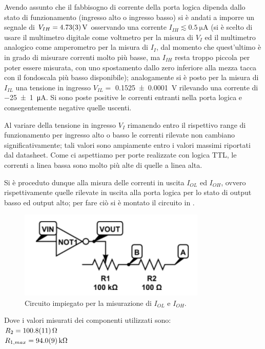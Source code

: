 	Avendo assunto che il fabbisogno di corrente della porta logica dipenda 	dallo stato di funzionamento (ingresso alto o ingresso basso)
	si è andati a imporre un segnale di $V_{IH} = \SI{4.73\pm 0.03}{\volt}$ osservando una corrente $I_{IH} \lesssim \SI{0.5}{\micro \ampere}$ (si è scelto di usare il multimetro digitale come voltmetro per la misura di $V_I$ ed il multimetro analogico come amperometro per la misura di $I_I$, dal momento che quest'ultimo è in grado di misurare correnti molto più basse, ma $I_{IH}$ resta troppo piccola per poter essere misurata, con uno spostamento dallo zero inferiore alla mezza tacca con il fondoscala più basso disponibile);
	analogamente si è posto per la misura di  $I_{IL}$ una tensione in ingresso $V_{IL} =$ \SI{0.1525(1)}{\volt} rilevando una corrente di \SI{-25(1)}{\micro \ampere}. Si sono poste positive le correnti entranti nella porta logica e consegentemente negative quelle uscenti.

	Al variare della tensione in ingresso $V_{I}$ rimanendo entro il rispettivo range di funzionamento per ingresso alto o basso le correnti rilevate non cambiano significativamente; tali valori sono ampiamente entro i valori massimi riportati dal datasheet.
	Come ci aspettiamo per porte realizzate con	logica TTL, le correnti a linea bassa sono molto più alte di quelle a linea	alta.

	Si è proceduto dunque alla misura delle correnti in uscita $I_{OL}$ ed $I_{OH}$, ovvero rispettivamente quelle rilevate in uscita alla porta logica per lo stato di output basso ed output alto; per fare ciò si è montato il circuito in .

	\begin{figure}[h]
		\centering
		\includegraphics[scale=0.75]{cir2.png}
		\caption{Circuito impiegato per la misurazione di $I_{OL}$ e $I_{OH}$. }
		\label{f:c2}
	\end{figure}

	Dove i valori misurati dei componenti utilizzati sono:\\
	$R_{2} = \SI{100.8 \pm 1.1}{\ohm}$\\
	$R_{1,max} = \SI{94.0 \pm 0.9 }{ \kilo \ohm}$\\

